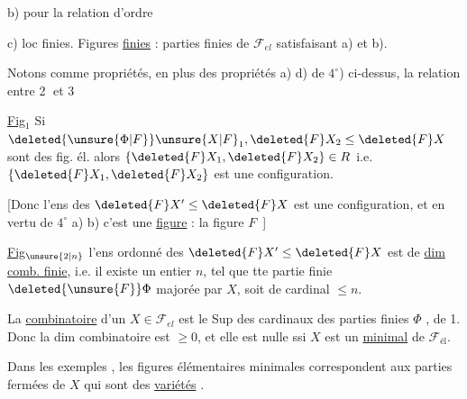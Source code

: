 b)  pour la relation d'ordre

c) loc finies. Figures \uline{finies} : parties finies de $\mathcal{F}_{el}$ satisfaisant a) et b).


Notons comme propriétés, en plus des propriétés a)  d) de $4^\circ$) ci-dessus, la relation entre \textcircled{2} et \textcircled{3}


\uline{Fig}$_1$ Si $\deleted{\unsure{\Phi|F}}\unsure{X|F}_1,\deleted{F}X_2\leq\deleted{F}X$ sont des fig. él. alors $\{\deleted{F}X_1,\deleted{F}X_2\}\in R$ i.e. $\{\deleted{F}X_1,\deleted{F}X_2\}$ est une configuration.

[Donc l'ens des $\deleted{F}X'\leq\deleted{F}X$ est une configuration, et en vertu de $4^\circ$ a) b) c'est  une \uline{figure} : la figure   $F$\unsure{\ldots|\,--}\ ]


\uline{Fig}$_{\unsure{2|n}}$   l'ens ordonné des $\deleted{F}X'\leq\deleted{F}X$ est de \uline{dim comb. finie}, i.e. il existe un entier $n$, tel que tte partie finie $\deleted{\unsure{F}}\Phi$  majorée par $X$,  soit de cardinal $\leq n$.

La \uline{} \uline{combinatoire} d'un $X\in\mathcal{F}_{el}$ est le Sup des cardinaux des parties finies $\Phi$ ,  de 1. Donc la dim combinatoire est $\geq 0$, et elle est nulle ssi $X$ est un \uline{} \uline{minimal} de $\mathcal{F}_{\text{él}}$.

Dans les exemples ,  les figures élémentaires minimales correspondent aux parties fermées de $X$ qui sont des \uline{variétés} \uline{}.

